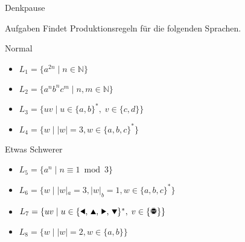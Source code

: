 {
\begin{frame}{Denkpause}
    \begin{alertblock}{Aufgaben}
    Findet Produktionsregeln für die folgenden Sprachen.
    \end{alertblock}
    \begin{block}{Normal}
    \begin{itemize}
        \item $L_1 = \{a^{2n}\;|\;n\in\mathbb{N}\}$
        \item $L_2 = \{a^nb^nc^m\;|\;n, m\in\mathbb{N}\}$
        \item $L_3 = \{uv\;|\;u\in\{a,b\}^\ast,\;v\in\{c,d\}\}$
        \item $L_4 = \{w\;|\;|w| = 3, w\in \{a,b,c\}^*\}$
    \end{itemize}
    \end{block}
    \begin{block}{Etwas Schwerer}
    \begin{itemize}
        \item $L_5 = \{a^n\;|\;n \equiv 1 \bmod 3\}$
        \item $L_6 = \{w\;|\;|w|_a = 3, |w|_b = 1, w\in \{a,b,c\}^*\}$
        \item $L_7 = \{uv\;|\;u\in\{\text{\Rewind, \MoveUp, \Forward, \MoveDown}\}^\ast,\;v\in\{\text{\Stopsign}\}\}$
        \item $L_8 = \{w\mid |w|=2, w \in \{a, b\}\}$
    \end{itemize}
    \end{block}
\end{frame}
}

